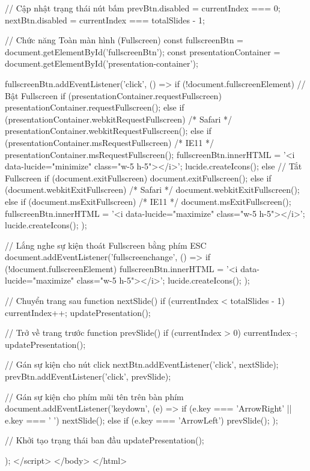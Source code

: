 {{                // Cập nhật trạng thái nút bấm
            prevBtn.disabled = currentIndex === 0;
            nextBtn.disabled = currentIndex === totalSlides - 1;
        }

        // Chức năng Toàn màn hình (Fullscreen)
        const fullscreenBtn = document.getElementById('fullscreenBtn');
        const presentationContainer = document.getElementById('presentation-container');

        fullscreenBtn.addEventListener('click', () => {
            if (!document.fullscreenElement) {
                // Bật Fullscreen
                if (presentationContainer.requestFullscreen) {
                    presentationContainer.requestFullscreen();
                } else if (presentationContainer.webkitRequestFullscreen) { /* Safari */
                    presentationContainer.webkitRequestFullscreen();
                } else if (presentationContainer.msRequestFullscreen) { /* IE11 */
                    presentationContainer.msRequestFullscreen();
                }
                fullscreenBtn.innerHTML = '<i data-lucide="minimize" class="w-5 h-5"></i>';
                lucide.createIcons();
            } else {
                // Tắt Fullscreen
                if (document.exitFullscreen) {
                    document.exitFullscreen();
                } else if (document.webkitExitFullscreen) { /* Safari */
                    document.webkitExitFullscreen();
                } else if (document.msExitFullscreen) { /* IE11 */
                    document.msExitFullscreen();
                }
                fullscreenBtn.innerHTML = '<i data-lucide="maximize" class="w-5 h-5"></i>';
                lucide.createIcons();
            }
        });

        // Lắng nghe sự kiện thoát Fullscreen bằng phím ESC
        document.addEventListener('fullscreenchange', () => {
            if (!document.fullscreenElement) {
                fullscreenBtn.innerHTML = '<i data-lucide="maximize" class="w-5 h-5"></i>';
                lucide.createIcons();
            }
        });

        // Chuyển trang sau
        function nextSlide() {
                if (currentIndex < totalSlides - 1) {
                    currentIndex++;
                    updatePresentation();
                }
            }

            // Trở về trang trước
            function prevSlide() {
                if (currentIndex > 0) {
                    currentIndex--;
                    updatePresentation();
                }
            }

            // Gán sự kiện cho nút click
            nextBtn.addEventListener('click', nextSlide);
            prevBtn.addEventListener('click', prevSlide);

            // Gán sự kiện cho phím mũi tên trên bàn phím
            document.addEventListener('keydown', (e) => {
                if (e.key === 'ArrowRight' || e.key === ' ') {
                    nextSlide();
                } else if (e.key === 'ArrowLeft') {
                    prevSlide();
                }
            });

            // Khởi tạo trạng thái ban đầu
            updatePresentation();
        });
    </script>
</body>
</html>